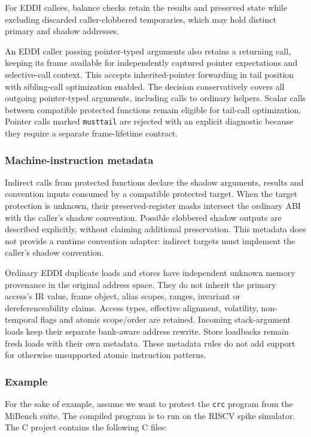 For EDDI callees, balance checks retain the results and preserved state while
excluding discarded caller-clobbered temporaries, which may hold distinct
primary and shadow addresses.

An EDDI caller passing pointer-typed arguments also retains a returning call,
keeping its frame available for independently captured pointer expectations and
selective-call context. This accepts inherited-pointer forwarding in tail
position with sibling-call optimization enabled. The decision conservatively
covers all outgoing pointer-typed arguments, including calls to ordinary
helpers. Scalar calls between compatible protected functions remain eligible
for tail-call optimization. Pointer calls marked \texttt{musttail} are rejected
with an explicit diagnostic because they require a separate frame-lifetime
contract.

\subsubsection{Machine-instruction metadata}
Indirect calls from protected functions declare the shadow arguments, results
and convention inputs consumed by a compatible protected target. When the target
protection is unknown, their preserved-register masks intersect the ordinary ABI
with the caller's shadow convention. Possible clobbered shadow outputs are
described explicitly, without claiming additional preservation. This metadata
does not provide a runtime convention adapter: indirect targets must implement
the caller's shadow convention.

Ordinary EDDI duplicate loads and stores have independent unknown memory
provenance in the original address space. They do not inherit the primary
access's IR value, frame object, alias scopes, ranges, invariant or
dereferenceability claims. Access types, effective alignment, volatility,
non-temporal flags and atomic scope/order are retained. Incoming stack-argument
loads keep their separate bank-aware address rewrite. Store loadbacks remain
fresh loads with their own metadata. These metadata rules do not add support
for otherwise unsupported atomic instruction patterns.

\subsubsection{Example}
For the sake of example, assume we want to protect the \texttt{crc} program from the MiBench suite. The
compiled program is to run on the RISCV spike simulator. The C project contains the following C files:

